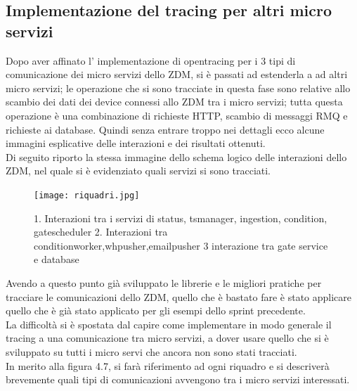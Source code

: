 \documentclass[a4paper,12pt,titlepage,italian,openany]{report}
\begin{document}
\subsection{Implementazione del tracing per altri micro servizi}
Dopo aver affinato l' implementazione di  opentracing\cite{opentracing:1} per i 3 tipi di comunicazione dei micro servizi dello ZDM\cite{zdm:1}, si è passati ad estenderla a ad altri micro servizi;
le operazione che si sono tracciate in questa fase sono relative allo scambio dei dati dei device connessi allo ZDM\cite{zdm:1} tra i micro servizi; tutta questa operazione è una combinazione di richieste HTTP, scambio di messaggi RMQ\cite{rabbit:1} e richieste ai database. Quindi senza entrare troppo nei dettagli ecco alcune immagini esplicative delle interazioni e dei risultati ottenuti.\\
Di seguito riporto la stessa immagine dello schema logico delle interazioni dello ZDM\cite{zdm:1}, nel quale si è evidenziato quali servizi si sono tracciati.
\begin{figure}[H]
    \texttt{[image: riquadri.jpg]}
    \centering
    \caption{1. Interazioni tra i servizi di status, tsmanager, ingestion, condition, gatescheduler 2. Interazioni tra conditionworker,whpusher,emailpusher 3 interazione tra gate service e database}
\end{figure}

Avendo a questo punto già sviluppato le librerie e le migliori pratiche per tracciare le comunicazioni dello ZDM\cite{zdm:1}, quello che è bastato fare è stato applicare quello che è già stato applicato per gli esempi dello sprint precedente.
\\ La difficoltà si è spostata dal capire come implementare in modo generale il tracing a una comunicazione tra micro servizi, a dover usare quello che si è sviluppato su tutti i micro servi che ancora non sono stati tracciati.\\
In merito alla figura 4.7, si farà riferimento ad ogni riquadro e si descriverà brevemente quali tipi di comunicazioni avvengono tra i micro servizi interessati.
\end{document}
